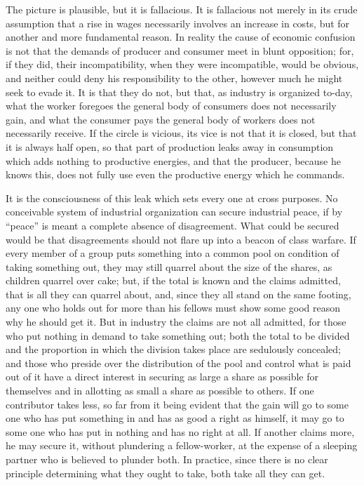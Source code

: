 \documentclass{book}
\begin{document}
The picture is plausible, but it is fallacious. It is fallacious not merely in its crude assumption that a rise in wages necessarily involves an increase in costs, but for another and more fundamental reason. In reality the cause of economic confusion is not that the demands of producer and consumer meet in blunt opposition; for, if they did, their incompatibility, when they were incompatible, would be obvious, and neither could deny his responsibility to the other, however much he might seek to evade it. It is that they do not, but that, as industry is organized to-day, what the worker foregoes the general body of consumers does not necessarily gain, and what the consumer pays the general body of workers does not necessarily receive. If the circle is vicious, its vice is not that it is closed, but that it is always half open, so that part of production leaks away in consumption which adds nothing to productive energies, and that the producer, because he knows this, does not fully use even the productive energy which he commands.

It is the consciousness of this leak which sets every one at cross purposes. No conceivable system of industrial organization can secure industrial peace, if by “peace” is meant a complete absence of disagreement. What could be secured would be that disagreements should not flare up into a beacon of class warfare. If every member of a group puts something into a common pool on condition of taking something out, they may still quarrel about the size of the shares, as children quarrel over cake; but, if the total is known and the claims admitted, that is all they can quarrel about, and, since they all stand on the same footing, any one who holds out for more than his fellows must show some good reason why he should get it. But in industry the claims are not all admitted, for those who put nothing in demand to take something out; both the total to be divided and the proportion in which the division takes place are sedulously concealed; and those who preside over the distribution of the pool and control what is paid out of it have a direct interest in securing as large a share as possible for themselves and in allotting as small a share as possible to others. If one contributor takes less, so far from it being evident that the gain will go to some one who has put something in and has as good a right as himself, it may go to some one who has put in nothing and has no right at all. If another claims more, he may secure it, without plundering a fellow-worker, at the expense of a sleeping partner who is believed to plunder both. In practice, since there is no clear principle determining what they ought to take, both take all they can get.
\end{document}
